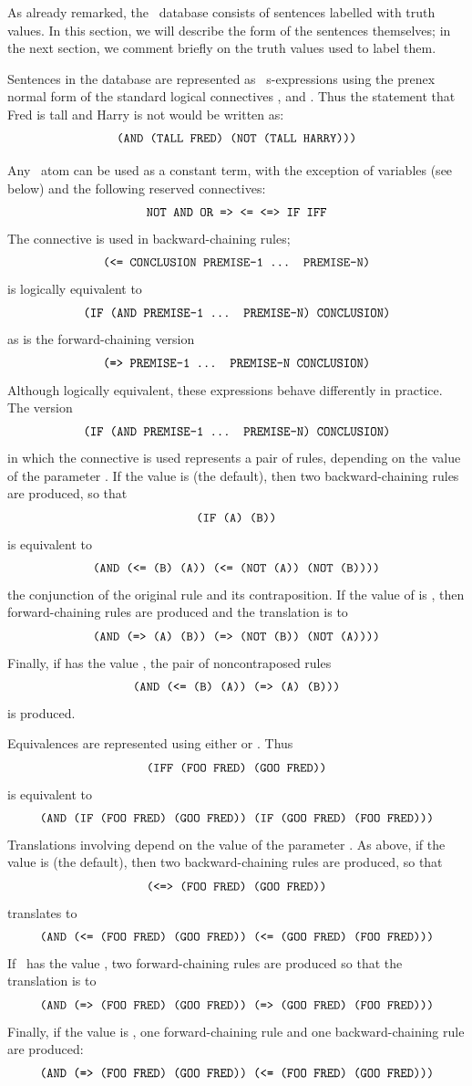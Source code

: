 As already remarked, the \mvl\ database consists of sentences labelled
with truth values.  In this section, we will describe the form of the
sentences themselves; in the next section, we comment briefly on the
truth values used to label them.

Sentences in the database are represented as \lisp\ s-expressions
using the prenex normal form  of the
standard logical connectives ,  and .
Thus the statement that Fred is tall and Harry is not would be
written as:
 \[\mbox{\tt (AND (TALL FRED) (NOT (TALL HARRY)))}\]

Any \lisp\ atom can be used as a constant term, with the exception of
variables (see below) and the following reserved connectives:
 \[\mbox{\tt NOT AND OR => <= <=> IF IFF}\]
The connective \type{<=} is used in backward-chaining rules;
 \[\mbox{\tt (<= CONCLUSION PREMISE-1 ... PREMISE-N)}\]
is logically equivalent to
 \[\mbox{\tt (IF (AND PREMISE-1 ... PREMISE-N) CONCLUSION)}\]
as is the forward-chaining version
 \[\mbox{\tt (=> PREMISE-1 ... PREMISE-N CONCLUSION)}\]
 Although logically equivalent, these expressions behave differently
in practice.  The version
 \[\mbox{\tt (IF (AND PREMISE-1 ... PREMISE-N) CONCLUSION)}\]
 in which the connective  is used represents a pair of
rules, depending on the value of the parameter .
If the value is  (the default), then two backward-chaining
rules are produced, so that
 \[\mbox{\tt (IF (A) (B))}\]
is equivalent to
 \[\mbox{\tt (AND (<= (B) (A)) (<= (NOT (A)) (NOT (B))))}\]
 the conjunction of the original rule and its contraposition.
If the value of  is , then
forward-chaining rules are produced and the translation is to
 \[\mbox{\tt (AND (=> (A) (B)) (=> (NOT (B)) (NOT (A))))}\]
 Finally, if  has the value , the
pair of noncontraposed rules
 \[\mbox{\tt (AND (<= (B) (A)) (=> (A) (B)))}\]
 is produced.

Equivalences are represented using either  or \type{<=>}.
Thus
 \[\mbox{\tt (IFF (FOO FRED) (GOO FRED))}\]
is equivalent to
 \[\mbox{\tt (AND (IF (FOO FRED) (GOO FRED)) (IF (GOO FRED) (FOO FRED)))}\]
 Translations involving \type{<=>} depend on the value of the
parameter \et{}.  As above, if the
value is  (the default), then two backward-chaining rules
are produced, so that
 \[\mbox{\tt (<=> (FOO FRED) (GOO FRED))}\]
translates to
 \[\mbox{\tt (AND (<= (FOO FRED) (GOO FRED)) (<= (GOO FRED) (FOO FRED)))}\]
 If \et\ has the value , two forward-chaining rules are produced
so that the translation is to
 \[\mbox{\tt (AND (=> (FOO FRED) (GOO FRED)) (=> (GOO FRED) (FOO FRED)))}\]
 Finally, if the value is , one forward-chaining rule and
one backward-chaining rule are produced:
 \[\mbox{\tt (AND (=> (FOO FRED) (GOO FRED)) (<= (FOO FRED) (GOO FRED)))}\]

